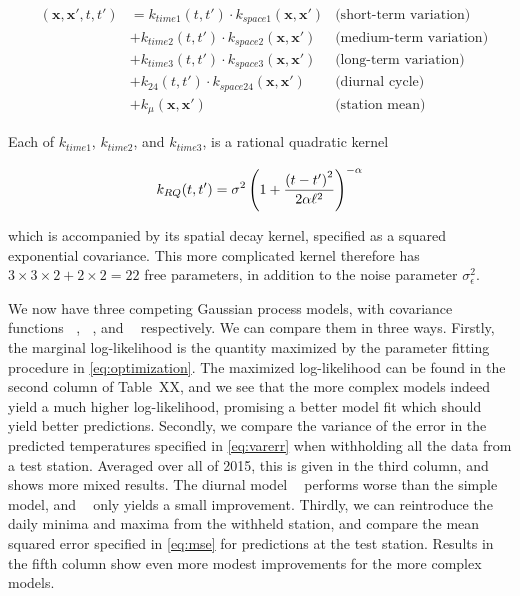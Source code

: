 \documentclass[letter]{article}
\newcommand{\genericdel}[3]{%
      \left#1#3\right#2
    }
\newcommand{\del}[1]{\genericdel(){#1}}
\newcommand{\xvec}{\mathbold{x}}
\newcommand{\sigman}{\sigma_{\epsilon}}
\DeclareMathOperator{\kSESE}{k_{\mathtt{SExSE}}}
\DeclareMathOperator{\kdiurn}{k_{\mathtt{SESE_24}}}
\DeclareMathOperator{\ksumprod}{k_{\mathtt{sumprod}}}
\begin{document}
\begin{equation}
\begin{aligned}
    \ksumprod(\xvec,\xvec',t,t') &= 
           k_{time1}(t,t') \cdot k_{space1}(\xvec, \xvec')  &\text{(short-term variation)} \\
        &+ k_{time2}(t,t') \cdot k_{space2}(\xvec, \xvec')  &\text{(medium-term variation)} \\
        &+ k_{time3}(t,t') \cdot k_{space3}(\xvec, \xvec')  &\text{(long-term variation)} \\
        &+ k_{24}(t,t') \cdot k_{space24}(\xvec, \xvec') &\text{(diurnal cycle)} \\
        &+ k_\mu(\xvec, \xvec') &\text{(station mean)}
\end{aligned}
\end{equation}

Each of \(k_{time1}\), \(k_{time2}\), and \(k_{time3}\), is a rational quadratic kernel

\begin{equation}
    k_{RQ}(t,t') = \sigma^2 \del{1 + \frac{\del{t-t'}^2}{2\alpha\ell^2} }^{-\alpha}
\end{equation}

which is accompanied by its spatial decay kernel, specified as a squared exponential covariance.
This more complicated kernel therefore has \(3 \times 3 \times 2 + 2 \times 2 = 22\) free parameters, in addition to the noise parameter \(\sigman^2\).

We now have three competing Gaussian process models, with covariance functions \(\kSESE\), \(\kdiurn\), and \(\ksumprod\) respectively. We can compare them in three ways. Firstly, the marginal log-likelihood is the quantity maximized by the parameter fitting procedure in \eqref{eq:optimization}. The maximized log-likelihood can be found in the second column of Table~XX, and we see that the more complex models indeed yield a much higher log-likelihood, promising a better model fit which should yield better predictions. Secondly, we compare the variance of the error in the predicted temperatures specified in \eqref{eq:varerr} when withholding all the data from a test station. Averaged over all of 2015, this is given in the third column, and shows more mixed results. The diurnal model \(\kdiurn\) performs worse than the simple \(\kSESE\) model, and \(\ksumprod\) only yields a small improvement.
Thirdly, we can reintroduce the daily minima and maxima from the withheld station, and compare the mean squared error specified in \eqref{eq:mse} for predictions at the test station. Results in the fifth column show even more modest improvements for the more complex models.
\end{document}
